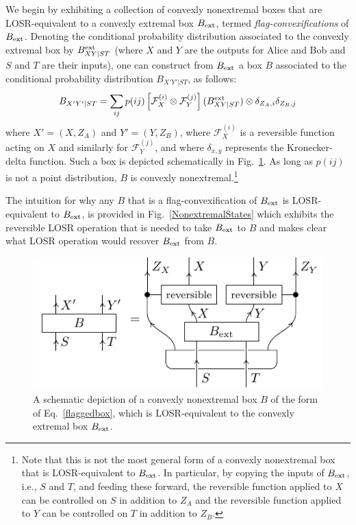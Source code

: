 \documentclass[12pt]{article}
\theoremstyle{plain}
\theoremstyle{definition}
\begin{document}
\begin{appendices}
We begin by exhibiting a collection of convexly nonextremal boxes that are LOSR-equivalent to a convexly extremal box $B_{\rm ext}$, termed {\em flag-convexifications} of $B_{\rm ext}$.
Denoting the conditional probability distribution associated to the convexly extremal box by $B^{\rm ext}_{X Y|ST}$ (where $X$ and $Y$ are the outputs for Alice and Bob and $S$ and $T$ are their inputs), one can construct from $B_{\rm ext}$ a box $B$ associated to the conditional probability distribution $B_{X' Y'|S T}$, as follows:
\begin{align}\label{flaggedbox}
B_{X'Y'|ST} = 
\sum_{ij} p(ij) \left[ \mathcal{F}_X^{(i)} \otimes \mathcal{F}_Y^{(j)} \right] ( B^{\rm ext}_{XY|ST} )   \otimes \delta_{Z_A,i} \delta_{Z_B,j}
\end{align}
where $X' =(X,Z_A)$ and $Y'=(Y,Z_B)$, where $\mathcal{F}_X^{(i)}$ is a reversible function acting on $X$ and similarly for $\mathcal{F}_Y^{(j)}$, and where $\delta_{x,y}$ represents the Kronecker-delta function.  Such a box is depicted schematically in Fig.~\ref{NonextremalBoxes}.
As long as $p(ij)$ is not a point distribution, $B$ is convexly nonextremal.\footnote{Note that this is not the most general form of a convexly nonextremal box that is LOSR-equivalent to $B_{\rm ext}$.  In particular, by copying the inputs of $B_{\rm ext}$, i.e., $S$ and $T$, and feeding these forward, the reversible function applied to $X$ can be controlled on $S$ in addition to $Z_A$ and the reversible function applied to $Y$ can be controlled on $T$ in addition to $Z_B$.}

The intuition for why any $B$ that is a flag-convexification of $B_{\rm ext}$ is LOSR-equivalent to  $B_{\rm ext}$, is provided in Fig.~\ref{NonextremalStates} which exhibits the reversible LOSR operation that is needed to take $B_{\rm ext}$ to $B$ and makes clear what LOSR operation would recover $B_{\rm ext}$ from $B$.


\begin{figure}[h!]
\centering
    \includegraphics[scale=1]{fig_losr_equiv_control_box.pdf}
    \caption{
    A schematic depiction of a convexly nonextremal box $B$ of the form of Eq.~\eqref{flaggedbox}, which is LOSR-equivalent to the convexly extremal box $B_{\rm ext}$.
}
    \label{NonextremalBoxes}
\end{figure}



\end{appendices}
\end{document}
